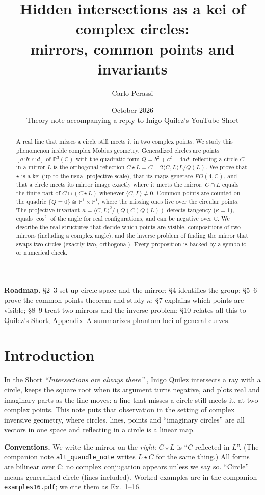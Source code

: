 \documentclass[11pt]{article}
\title{Hidden intersections as a kei of complex circles:\\ mirrors, common points and invariants}
\author{Carlo Perassi}
\date{October 2026\\\small Theory note accompanying a reply to Inigo Quilez's YouTube Short}
\theoremstyle{definition}\newtheorem{definition}[theorem]{Definition}\newtheorem{remark}[theorem]{Remark}\newtheorem{example}[theorem]{Example}
\newcommand{\C}{\mathbb{C}}\newcommand{\R}{\mathbb{R}}\newcommand{\PP}{\mathbb{P}}
\newcommand{\ip}[2]{\langle #1,#2\rangle}\newcommand{\pt}{\mathrm{pt}}\newcommand{\Qd}{\mathcal{Q}}
\begin{document}
\maketitle
\begin{abstract}
A real line that misses a circle still meets it in two complex points. We study this phenomenon inside complex Möbius geometry. Generalized circles are points $[a:b:c:d]$ of $\PP^3(\C)$ with the quadratic form $Q=b^2+c^2-4ad$; reflecting a circle $C$ in a mirror $L$ is the orthogonal reflection $C\star L=C-2\ip CL L/Q(L)$. We prove that $\star$ is a kei (up to the usual projective scale), that its maps generate $PO(4,\C)$, and that a circle meets its mirror image exactly where it meets the mirror: $C\cap L$ equals the finite part of $C\cap(C\star L)$ whenever $\ip CL\neq0$. Common points are counted on the quadric $\{Q=0\}\cong\PP^1\times\PP^1$, where the missing ones live over the circular points. The projective invariant $\kappa=\ip CL^2/(Q(C)Q(L))$ detects tangency ($\kappa=1$), equals $\cos^2$ of the angle for real configurations, and can be negative over $\C$. We describe the real structures that decide which points are visible, compositions of two mirrors (including a complex angle), and the inverse problem of finding the mirror that swaps two circles (exactly two, orthogonal). Every proposition is backed by a symbolic or numerical check.
\end{abstract}
\tableofcontents
\smallskip\noindent\textbf{Roadmap.} §2--3 set up circle space and the mirror; §4 identifies the group; §5--6 prove the common-points theorem and study $\kappa$; §7 explains which points are visible; §8--9 treat two mirrors and the inverse problem; §10 relates all this to Quilez's Short; Appendix~A summarizes phantom loci of general curves.

\section{Introduction}
In the Short \emph{``Intersections are always there''} \cite{IQ}, Inigo Quilez intersects a ray with a circle, keeps the square root when its argument turns negative, and plots real and imaginary parts as the line moves: a line that misses a circle still meets it, at two complex points. This note puts that observation in the setting of complex inversive geometry, where circles, lines, points and ``imaginary circles'' are all vectors in one space and reflecting in a circle is a linear map.

\textbf{Conventions.} We write the mirror on the \emph{right}: $C\star L$ is ``$C$ reflected in $L$''. (The companion note \texttt{alt\_quandle\_note} writes $L\star C$ for the same thing.) All forms are bilinear over $\C$: no complex conjugation appears unless we say so. ``Circle'' means generalized circle (lines included). Worked examples are in the companion \texttt{examples16.pdf}; we cite them as Ex.~1--16.
\end{document}
